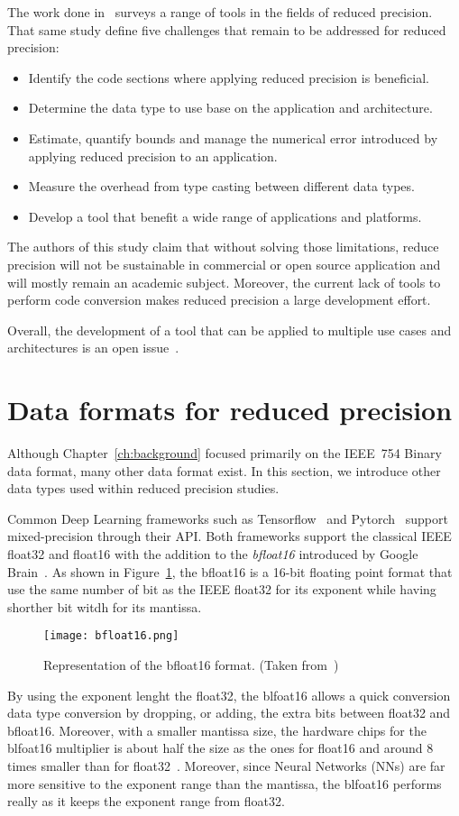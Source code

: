 The work done in~\cite{Cherubin2020-tt} surveys a range of tools in the fields of reduced precision.
That same study define five challenges that remain to be addressed for reduced precision:
\begin{itemize}
	\item[1.] Identify the code sections where applying reduced precision is beneficial.
	\item[2.] Determine the data type to use base on the application and architecture.
	\item[3.] Estimate, quantify bounds and manage the numerical error introduced by applying reduced precision to an application.
	\item[4.] Measure the overhead from type casting between different data types.
	\item[5.] Develop a tool that benefit a wide range of applications and platforms.
\end{itemize}
The authors of this study claim that without solving those limitations, reduce 
precision will not be sustainable in commercial or open source application and 
will mostly remain an academic subject.
Moreover, the current lack of tools to perform code conversion makes reduced precision
a large development effort.

Overall, the development of a tool that can be applied to multiple use cases and
architectures is an open issue~\cite{Cherubin2020-tt}.

\section{Data formats for reduced precision}
\label{sc:rp-data-format}
Although Chapter~\ref{ch:background} focused primarily on the IEEE~754 Binary data format, many other data format exist.
In this section, we introduce other data types used within reduced precision studies.

Common Deep Learning frameworks such as Tensorflow~\cite{tensorflow2015-whitepaper} and Pytorch~\cite{PyTorch_2019} support mixed-precision through their API.
Both frameworks support the classical IEEE float32 and float16 with the addition to the \textit{bfloat16} introduced by Google Brain~\cite{bfloat16}.
As shown in Figure~\ref{fig:bfloat16}, the bfloat16 is a 16-bit floating point format that use
the same number of bit as the IEEE float32 for its exponent while having shorther bit witdh for its mantissa.
\begin{figure}[b]
	\centering
	\texttt{[image: bfloat16.png]}
	\caption{Representation of the bfloat16 format. (Taken from~\cite{bfloat16})}
	\label{fig:bfloat16}
\end{figure}
By using the exponent lenght the float32, the blfoat16 allows a quick conversion
data type conversion by dropping, or adding, the extra bits between float32 and bfloat16.
Moreover, with a smaller mantissa size, the hardware chips for the blfoat16 multiplier
is about half the size as the ones for float16 and around 8 times smaller than for float32~\cite{bfloat16}.
Moreover, since Neural Networks (NNs) are far more sensitive to the exponent range than the mantissa,
the blfoat16 performs really as it keeps the exponent range from float32.


